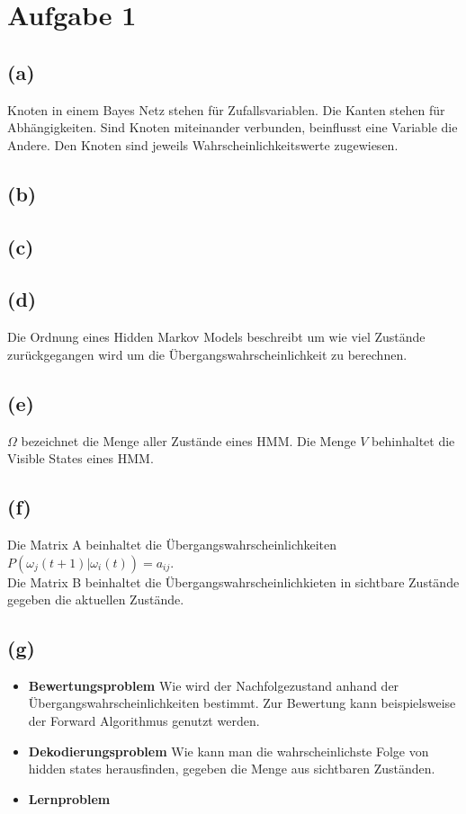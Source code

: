 \documentclass[a4paper]{scrartcl}
\begin{document}
\section*{Aufgabe 1}
\subsection*{(a)}
Knoten in einem Bayes Netz stehen für Zufallsvariablen. Die Kanten stehen für Abhängigkeiten. Sind Knoten miteinander verbunden, beinflusst eine Variable die Andere. Den Knoten sind jeweils Wahrscheinlichkeitswerte zugewiesen.


\subsection*{(b)}



\subsection*{(c)}




\subsection*{(d)}
Die Ordnung eines Hidden Markov Models beschreibt um wie viel Zustände zurückgegangen wird um die Übergangswahrscheinlichkeit zu berechnen. 

\subsection*{(e)}
$\Omega$ bezeichnet die Menge aller Zustände eines HMM.
Die Menge $V$ behinhaltet die Visible States eines HMM.

\subsection*{(f)}
Die Matrix A beinhaltet die Übergangswahrscheinlichkeiten $P(\omega_j(t+1)|\omega_i(t))=a_{ij}$.\\
Die Matrix B beinhaltet die Übergangswahrscheinlichkieten in sichtbare Zustände gegeben die aktuellen Zustände.


\subsection*{(g)}
\begin{itemize}
	\item \textbf{Bewertungsproblem} Wie wird der Nachfolgezustand anhand der Übergangswahrscheinlichkeiten bestimmt. %
	Zur Bewertung kann beispielsweise der Forward Algorithmus genutzt werden.
	
	\item \textbf{Dekodierungsproblem} Wie kann man die wahrscheinlichste Folge von hidden states herausfinden, gegeben die Menge aus sichtbaren Zuständen.
	
	\item \textbf{Lernproblem} %
\end{itemize}
\end{document}
